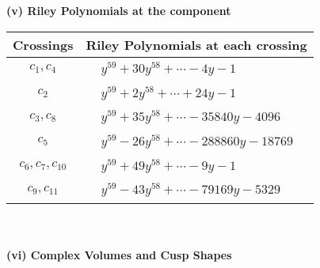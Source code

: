 \documentclass[1p]{elsarticle_modified}
\theoremstyle{definition}
\begin{document}
\newpage\renewcommand{\arraystretch}{1}
\flushleft \textbf{(v) Riley Polynomials at the component}\newline \\
\begin{tabular}{m{50pt}|m{274pt}}
Crossings & \hspace{64pt}Riley Polynomials at each crossing \\
\hline $$\begin{aligned}c_{1},c_{4}\end{aligned}$$&$\begin{aligned}
&y^{59}+30 y^{58}+\cdots-4 y-1
\end{aligned}$\\
\hline $$\begin{aligned}c_{2}\end{aligned}$$&$\begin{aligned}
&y^{59}+2 y^{58}+\cdots+24 y-1
\end{aligned}$\\
\hline $$\begin{aligned}c_{3},c_{8}\end{aligned}$$&$\begin{aligned}
&y^{59}+35 y^{58}+\cdots-35840 y-4096
\end{aligned}$\\
\hline $$\begin{aligned}c_{5}\end{aligned}$$&$\begin{aligned}
&y^{59}-26 y^{58}+\cdots-288860 y-18769
\end{aligned}$\\
\hline $$\begin{aligned}c_{6},c_{7},c_{10}\end{aligned}$$&$\begin{aligned}
&y^{59}+49 y^{58}+\cdots-9 y-1
\end{aligned}$\\
\hline $$\begin{aligned}c_{9},c_{11}\end{aligned}$$&$\begin{aligned}
&y^{59}-43 y^{58}+\cdots-79169 y-5329
\end{aligned}$\\
\hline
\end{tabular}\\~\\
\newpage\flushleft \textbf{(vi) Complex Volumes and Cusp Shapes}
\end{document}
